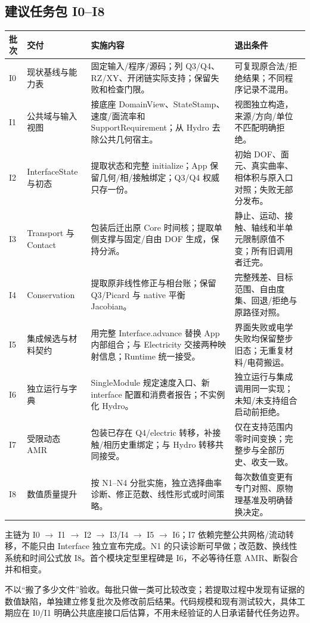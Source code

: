 \documentclass[UTF8,a4paper,11pt,fontset=fandol]{ctexart}
\begin{document}
\subsection{建议任务包 I0--I8}
\begin{longtable}{@{}P{.07\textwidth}P{.24\textwidth}P{.39\textwidth}P{.24\textwidth}@{}}
\toprule 批次 & 交付 & 实施内容 & 退出条件\\\midrule\endhead
I0 & 现状基线与能力表 & 固定输入/程序/源码；列 Q3/Q4、RZ/XY、开闭链实际支持；保留失败和检查门限。 & 可复现原合法/拒绝结果；不同程序记录不混用。\\
I1 & 公共域与输入视图 & 接底座 DomainView、StateStamp、速度/面流率和 SupportRequirement；从 Hydro 去除公共几何宿主。 & 视图独立构造，来源/方向/单位不匹配明确拒绝。\\
I2 & InterfaceState 与初态 & 提取状态和完整 initialize；App 保留几何/相/接触绑定；Q3/Q4 权威只存一份。 & 初始 DOF、面元、真实曲率、相体积与原入口对照；失败无部分发布。\\
I3 & Transport 与 Contact & 包装后迁出原 Core 时间核；提取单侧支撑与固定/自由 DOF 生成，保持分派。 & 静止、运动、接触、轴线和半单元限制原值不变；所有旧调用者迁完。\\
I4 & Conservation & 提取原非线性修正与相台账；保留 Q3/Picard 与 native 平衡 Jacobian。 & 完整残差、目标范围、自由度集、回退/拒绝与原路径对照。\\
I5 & 集成候选与材料契约 & 用完整 Interface.advance 替换 App 内部组合；与 Electricity 交接两种映射信息；Runtime 统一接受。 & 界面失败或电学失败均保留整步旧态；无重复材料/电荷搬运。\\
I6 & 独立运行与字典 & SingleModule 规定速度入口、新 interface 配置和消费者报告；不实例化 Hydro。 & 独立运行与集成调用同一实现；未知/未支持组合启动前拒绝。\\
I7 & 受限动态 AMR & 包装已存在 Q4/electric 转移，补接触/相历史重绑定；与 Hydro 转移共同接受。 & 仅在支持范围内零时间变换；完整步与全部历史、收支一致。\\
I8 & 数值质量提升 & 按 N1--N4 分批实施，独立选择曲率诊断、修正范数、线性形式或时间策略。 & 每次数值变更有专门对照、原物理基准及明确替换决定。\\
\bottomrule
\end{longtable}
主链为 I0 $\to$ I1 $\to$ I2 $\to$ I3/I4 $\to$ I5 $\to$ I6；I7 依赖完整公共网格/流动转移，不能只由 Interface 独立宣布完成。N1 的只读诊断可早做；改范数、换线性系统和时间公式放 I8。首个模块定型里程碑是 I6，不必等待任意 AMR、断裂合并和相变。

不以“搬了多少文件”验收。每批只做一类可比较改变；若提取过程中发现有证据的数值缺陷，单独建立修复批次及修改前后结果。代码规模和现有测试较大，具体工期应在 I0/I1 明确公共底座接口后估算，不用未经验证的人日承诺替代任务边界。
\end{document}
